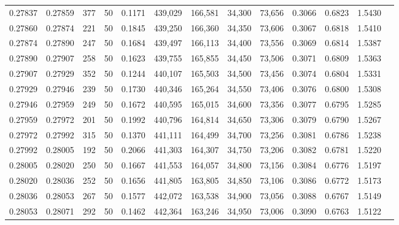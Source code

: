 \begin{tabular}{rrrrrrrrrrrrr}
0.27837 & 0.27859 &   377 &  50 &                                     0.1171 & 439,029 & 166,581 &  34,300 &  73,656 & 0.3066 & 0.6823 & 1.5430 \\
0.27860 & 0.27874 &   221 &  50 &                                     0.1845 & 439,250 & 166,360 &  34,350 &  73,606 & 0.3067 & 0.6818 & 1.5410 \\
0.27874 & 0.27890 &   247 &  50 &                                     0.1684 & 439,497 & 166,113 &  34,400 &  73,556 & 0.3069 & 0.6814 & 1.5387 \\
0.27890 & 0.27907 &   258 &  50 &                                     0.1623 & 439,755 & 165,855 &  34,450 &  73,506 & 0.3071 & 0.6809 & 1.5363 \\
0.27907 & 0.27929 &   352 &  50 &                                     0.1244 & 440,107 & 165,503 &  34,500 &  73,456 & 0.3074 & 0.6804 & 1.5331 \\
0.27929 & 0.27946 &   239 &  50 &                                     0.1730 & 440,346 & 165,264 &  34,550 &  73,406 & 0.3076 & 0.6800 & 1.5308 \\
0.27946 & 0.27959 &   249 &  50 &                                     0.1672 & 440,595 & 165,015 &  34,600 &  73,356 & 0.3077 & 0.6795 & 1.5285 \\
0.27959 & 0.27972 &   201 &  50 &                                     0.1992 & 440,796 & 164,814 &  34,650 &  73,306 & 0.3079 & 0.6790 & 1.5267 \\
0.27972 & 0.27992 &   315 &  50 &                                     0.1370 & 441,111 & 164,499 &  34,700 &  73,256 & 0.3081 & 0.6786 & 1.5238 \\
0.27992 & 0.28005 &   192 &  50 &                                     0.2066 & 441,303 & 164,307 &  34,750 &  73,206 & 0.3082 & 0.6781 & 1.5220 \\
0.28005 & 0.28020 &   250 &  50 &                                     0.1667 & 441,553 & 164,057 &  34,800 &  73,156 & 0.3084 & 0.6776 & 1.5197 \\
0.28020 & 0.28036 &   252 &  50 &                                     0.1656 & 441,805 & 163,805 &  34,850 &  73,106 & 0.3086 & 0.6772 & 1.5173 \\
0.28036 & 0.28053 &   267 &  50 &                                     0.1577 & 442,072 & 163,538 &  34,900 &  73,056 & 0.3088 & 0.6767 & 1.5149 \\
0.28053 & 0.28071 &   292 &  50 &                                     0.1462 & 442,364 & 163,246 &  34,950 &  73,006 & 0.3090 & 0.6763 & 1.5122 \\

\end{tabular}
